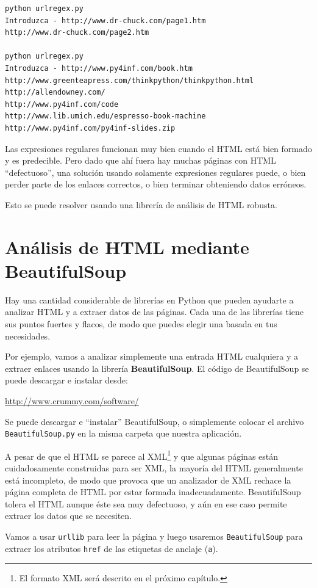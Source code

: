\beforeverb
\begin{verbatim}
python urlregex.py 
Introduzca - http://www.dr-chuck.com/page1.htm
http://www.dr-chuck.com/page2.htm

python urlregex.py 
Introduzca - http://www.py4inf.com/book.htm
http://www.greenteapress.com/thinkpython/thinkpython.html
http://allendowney.com/
http://www.py4inf.com/code
http://www.lib.umich.edu/espresso-book-machine
http://www.py4inf.com/py4inf-slides.zip
\end{verbatim}
\afterverb
%
Las expresiones regulares funcionan muy bien cuando el HTML está bien formado
y es predecible. Pero dado que ahí fuera hay muchas páginas con HTML ``defectuoso'',
una solución usando solamente expresiones regulares puede, o bien
perder parte de los enlaces correctos, o bien terminar obteniendo datos erróneos.

Esto se puede resolver usando una librería de análisis de HTML robusta.

\section{Análisis de HTML mediante BeautifulSoup}

Hay una cantidad considerable de librerías en Python que pueden ayudarte a analizar
HTML y a extraer datos de las páginas. Cada una de las librerías
tiene sus puntos fuertes y flacos, de modo que puedes elegir una
basada en tus necesidades.

Por ejemplo, vamos a analizar simplemente una entrada HTML cualquiera
y a extraer enlaces usando la librería {\bf BeautifulSoup}.
El código de BeautifulSoup se puede descargar e instalar
desde:

\url{http://www.crummy.com/software/}

Se puede descargar e ``instalar'' BeautifulSoup, o
simplemente colocar el archivo {\tt BeautifulSoup.py} en la
misma carpeta que nuestra aplicación.

A pesar de que el HTML se parece al XML\footnote{El formato XML será descrito
en el próximo capítulo.} y que algunas páginas están cuidadosamente
construidas para ser XML, la mayoría del HTML generalmente está
incompleto, de modo que provoca que un analizador de XML rechace la página completa de HTML
por estar formada inadecuadamente. BeautifulSoup tolera el HTML
aunque éste sea muy defectuoso, y aún en ese caso permite extraer los datos que se necesiten.

Vamos a usar {\tt urllib} para leer la página y luego usaremos
{\tt BeautifulSoup} para extraer los atributos {\tt href} de las
etiquetas de anclaje ({\tt a}).

